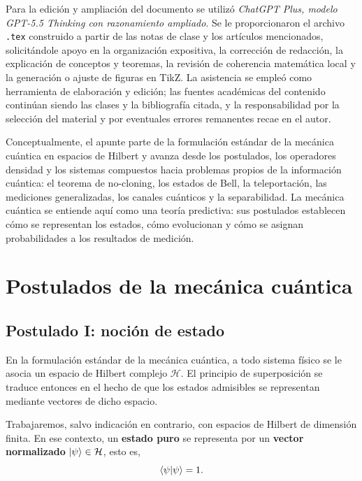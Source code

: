 \documentclass[12pt,a4paper]{article}
\theoremstyle{definition}
\theoremstyle{plain}
\theoremstyle{remark}
\newcommand{\Hil}{\mathcal{H}}
\begin{document}
Para la edición y ampliación del documento se utilizó \emph{ChatGPT Plus, modelo GPT-5.5 Thinking con razonamiento ampliado}. Se le proporcionaron el archivo \texttt{.tex} construido a partir de las notas de clase y los artículos mencionados, solicitándole apoyo en la organización expositiva, la corrección de redacción, la explicación de conceptos y teoremas, la revisión de coherencia matemática local y la generación o ajuste de figuras en TikZ. La asistencia se empleó como herramienta de elaboración y edición; las fuentes académicas del contenido continúan siendo las clases y la bibliografía citada, y la responsabilidad por la selección del material y por eventuales errores remanentes recae en el autor.

Conceptualmente, el apunte parte de la formulación estándar de la mecánica cuántica en espacios de Hilbert y avanza desde los postulados, los operadores densidad y los sistemas compuestos hacia problemas propios de la información cuántica: el teorema de no-cloning, los estados de Bell, la teleportación, las mediciones generalizadas, los canales cuánticos y la separabilidad. La mecánica cuántica se entiende aquí como una teoría predictiva: sus postulados establecen cómo se representan los estados, cómo evolucionan y cómo se asignan probabilidades a los resultados de medición.

\newpage
\newpage

\section{Postulados de la mecánica cuántica}


\subsection{Postulado I: noción de estado}

En la formulación estándar de la mecánica cuántica, a todo sistema físico se le asocia un espacio de Hilbert complejo $\Hil$. El principio de superposición se traduce entonces en el hecho de que los estados admisibles se representan mediante vectores de dicho espacio.

Trabajaremos, salvo indicación en contrario, con espacios de Hilbert de dimensión finita. En ese contexto, un \textbf{estado puro} se representa por un \textbf{vector normalizado} $\ket{\psi}\in\Hil$, esto es,
\begin{equation*}
    \braket{\psi|\psi}=1.
\end{equation*}
\end{document}
